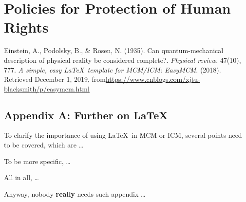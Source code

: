 \documentclass[12pt]{article}  %
\begin{document}
\subsection{}



\subsection{}




\subsection{}





\subsection{}




\section{Policies for Protection of Human Rights}



\begin{thebibliography}{99}
 Einstein, A., Podolsky, B., \& Rosen, N. (1935). Can quantum-mechanical description of physical reality be considered complete?. \emph{Physical review}, 47(10), 777.
 \emph{A simple, easy \LaTeX\ template for MCM/ICM: EasyMCM}. (2018). Retrieved December 1, 2019, from\url{https://www.cnblogs.com/xjtu-blacksmith/p/easymcm.html}
\end{thebibliography}





\begin{subappendices}  %

\section{Appendix A: Further on \LaTeX}
To clarify the importance of using \LaTeX\ in MCM or ICM, several points need to be covered, which are \ldots

To be more specific, \ldots

All in all, \ldots

Anyway, nobody \textbf{really} needs such appendix \ldots

\end{subappendices}
\end{document}
